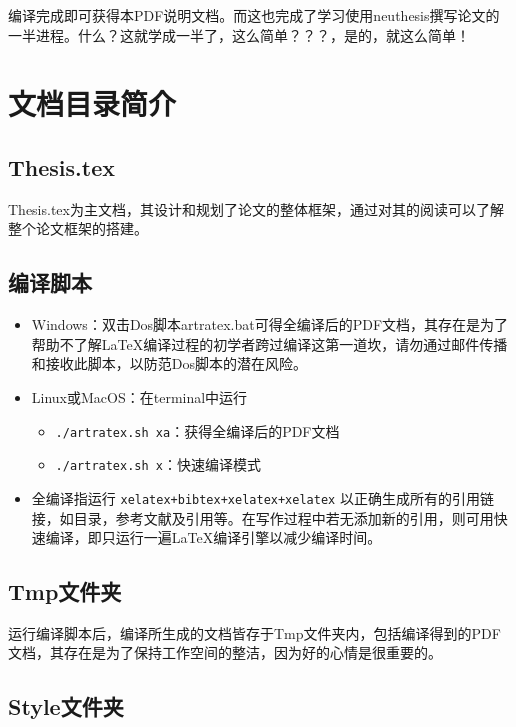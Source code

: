 编译完成即可获得本PDF说明文档。而这也完成了学习使用neuthesis撰写论文的一半进程。什么？这就学成一半了，这么简单？？？，是的，就这么简单！

\section{文档目录简介}

\subsection{Thesis.tex}

Thesis.tex为主文档，其设计和规划了论文的整体框架，通过对其的阅读可以了解整个论文框架的搭建。

\subsection{编译脚本}

\begin{itemize}
    \item Windows：双击Dos脚本artratex.bat可得全编译后的PDF文档，其存在是为了帮助不了解LaTeX编译过程的初学者跨过编译这第一道坎，请勿通过邮件传播和接收此脚本，以防范Dos脚本的潜在风险。
    \item Linux或MacOS：在terminal中运行
        \begin{itemize}
            \item \verb|./artratex.sh xa|：获得全编译后的PDF文档
            \item \verb|./artratex.sh x|：快速编译模式
        \end{itemize}
    \item 全编译指运行 \verb|xelatex+bibtex+xelatex+xelatex| 以正确生成所有的引用链接，如目录，参考文献及引用等。在写作过程中若无添加新的引用，则可用快速编译，即只运行一遍LaTeX编译引擎以减少编译时间。
\end{itemize}

\subsection{Tmp文件夹}

运行编译脚本后，编译所生成的文档皆存于Tmp文件夹内，包括编译得到的PDF文档，其存在是为了保持工作空间的整洁，因为好的心情是很重要的。

\subsection{Style文件夹}

